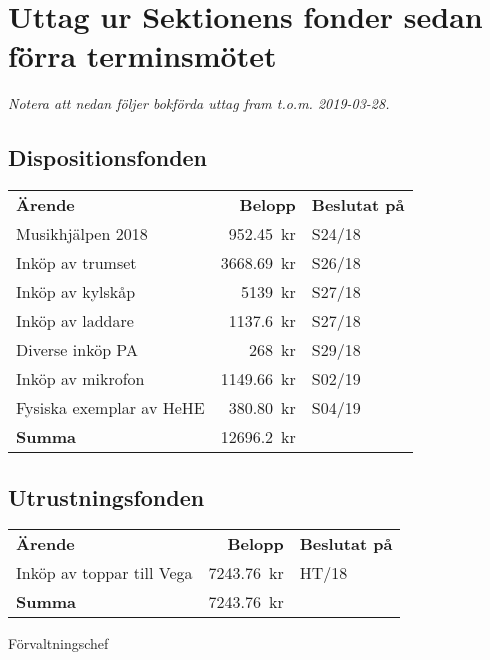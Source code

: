 \documentclass[../_main/handlingar.tex]{subfiles}
\begin{document}
\section{Uttag ur Sektionens fonder sedan förra terminsmötet}
\emph{Notera att nedan följer bokförda uttag fram t.o.m. 2019-03-28.}

\subsection*{Dispositionsfonden}
\begin{tabular}{l r l}
    \textbf{Ärende} & \textbf{Belopp} & \textbf{Beslutat på} \\
    Musikhjälpen 2018 & \SI{952,45}{kr} & S24/18 \\
    Inköp av trumset & \SI{3668,69}{kr} & S26/18 \\
    Inköp av kylskåp & \SI{5 139}{kr} & S27/18 \\
    Inköp av laddare & \SI{1137,6}{kr} & S27/18 \\
    Diverse inköp PA & \SI{268}{kr} & S29/18 \\
    Inköp av mikrofon & \SI{1149,66}{kr} & S02/19 \\
    Fysiska exemplar av HeHE & \SI{380,80}{kr} & S04/19 \\
    \hline
    \textbf{Summa} & \SI{12696,2}{kr} \\
\end{tabular}

\subsection*{Utrustningsfonden}
\begin{tabular}{l r l}
    \textbf{Ärende} & \textbf{Belopp} & \textbf{Beslutat på} \\
    Inköp av toppar till Vega & \SI{7243,76}{kr} & HT/18 \\
    \hline
    \textbf{Summa} & \SI{7243,76}{kr} \\
\end{tabular}

\begin{signatures}{1}
    \ist
    \signature{\fvc}{Förvaltningschef}
\end{signatures}
\end{document}

